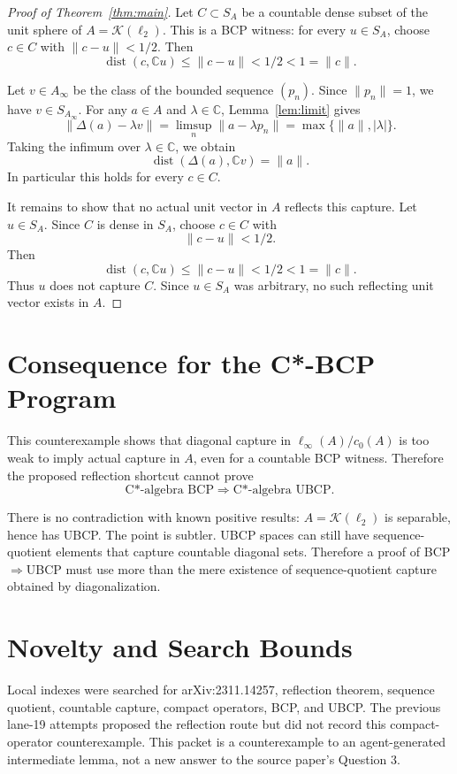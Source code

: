 \documentclass[11pt]{article}
\newcommand{\C}{\mathbb C}
\newcommand{\Kcal}{\mathcal K}
\newcommand{\dist}{\operatorname{dist}}
\newcommand{\diag}{\Delta}
\begin{document}
\begin{proof}[Proof of Theorem~\ref{thm:main}]
Let \(C\subset S_A\) be a countable dense subset of the unit sphere of
\(A=\Kcal(\ell_2)\).  This is a BCP witness: for every \(u\in S_A\), choose
\(c\in C\) with \(\|c-u\|<1/2\).  Then
\[
        \dist(c,\C u)\le \|c-u\|<1/2<1=\|c\|.
\]

Let \(v\in A_\infty\) be the class of the bounded sequence \((p_n)\).  Since
\(\|p_n\|=1\), we have \(v\in S_{A_\infty}\).  For any \(a\in A\) and
\(\lambda\in\C\), Lemma~\ref{lem:limit} gives
\[
        \|\diag(a)-\lambda v\|
        =
        \limsup_n\|a-\lambda p_n\|
        =
        \max\{\|a\|,|\lambda|\}.
\]
Taking the infimum over \(\lambda\in\C\), we obtain
\[
        \dist(\diag(a),\C v)=\|a\|.
\]
In particular this holds for every \(c\in C\).

It remains to show that no actual unit vector in \(A\) reflects this capture.
Let \(u\in S_A\).  Since \(C\) is dense in \(S_A\), choose \(c\in C\) with
\[
        \|c-u\|<1/2.
\]
Then
\[
        \dist(c,\C u)\le \|c-u\|<1/2<1=\|c\|.
\]
Thus \(u\) does not capture \(C\).  Since \(u\in S_A\) was arbitrary, no such
reflecting unit vector exists in \(A\).
\end{proof}

\section*{Consequence for the C*-BCP Program}

This counterexample shows that diagonal capture in
\(\ell_\infty(A)/c_0(A)\) is too weak to imply actual capture in \(A\), even
for a countable BCP witness.  Therefore the proposed reflection shortcut
cannot prove
\[
        \text{C*-algebra BCP}\Rightarrow\text{C*-algebra UBCP}.
\]

There is no contradiction with known positive results: \(A=\Kcal(\ell_2)\)
is separable, hence has UBCP.  The point is subtler.  UBCP spaces can still
have sequence-quotient elements that capture countable diagonal sets.
Therefore a proof of BCP\(\Rightarrow\)UBCP must use more than the mere
existence of sequence-quotient capture obtained by diagonalization.

\section*{Novelty and Search Bounds}

Local indexes were searched for arXiv:2311.14257, reflection theorem,
sequence quotient, countable capture, compact operators, BCP, and UBCP.  The
previous lane-19 attempts proposed the reflection route but did not record
this compact-operator counterexample.  This packet is a counterexample to an
agent-generated intermediate lemma, not a new answer to the source paper's
Question 3.
\end{document}
